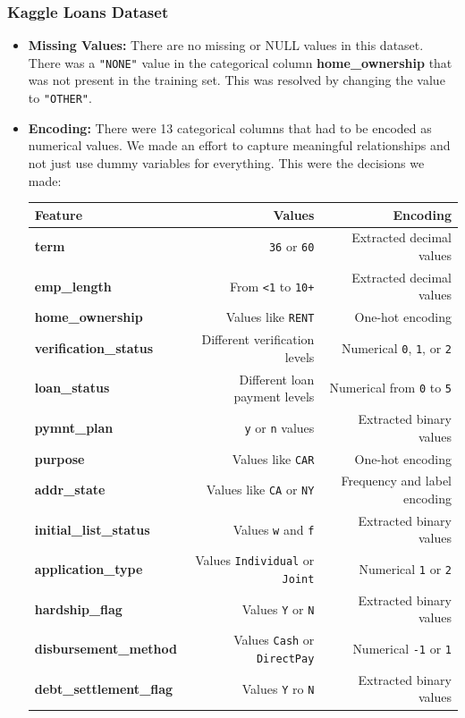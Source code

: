\documentclass[12pt,a4paper]{article}
\begin{document}
\subsubsection{Kaggle Loans Dataset}
\begin{itemize}
\item \textbf{Missing Values:} There are no missing or NULL values in this dataset. There was a \texttt{"NONE"} value in the categorical column \textbf{home\_ownership} that was not present in the training set. This was resolved by changing the value to \texttt{"OTHER"}.
\item \textbf{Encoding:} There were 13 categorical columns that had to be encoded as numerical values. We made an effort to capture meaningful relationships and not just use dummy variables for everything. This were the decisions we made:

\begin{table}[h]
\centering
\label{tab:Data_summary}
\begin{tabular}{lrr}
    \toprule
        Feature & Values & Encoding \\
        \midrule
        \textbf{term} & \texttt{36} or \texttt{60} & Extracted decimal values \\
        \textbf{emp\_length} & From \texttt{<1} to \texttt{10+} & Extracted decimal values \\
        \textbf{home\_ownership} & Values like \texttt{RENT} & One-hot encoding \\
        \textbf{verification\_status} & Different verification levels & Numerical \texttt{0}, \texttt{1}, or \texttt{2} \\
        \textbf{loan\_status} & Different loan payment levels & Numerical from \texttt{0} to \texttt{5} \\
        \textbf{pymnt\_plan} & \texttt{y} or \texttt{n} values &  Extracted binary values \\
        \textbf{purpose} & Values like \texttt{CAR} & One-hot encoding \\
        \textbf{addr\_state} & Values like \texttt{CA} or \texttt{NY} & Frequency and label encoding \\
        \textbf{initial\_list\_status} & Values \texttt{w} and \texttt{f} & Extracted binary values \\
        \textbf{application\_type} & Values \texttt{Individual} or \texttt{Joint} & Numerical \texttt{1} or \texttt{2} \\
        \textbf{hardship\_flag} &  Values \texttt{Y} or \texttt{N} & Extracted binary values \\
        \textbf{disbursement\_method} & Values \texttt{Cash} or \texttt{DirectPay} & Numerical \texttt{-1} or \texttt{1} \\
        \textbf{debt\_settlement\_flag} & Values \texttt{Y} ro \texttt{N} & Extracted binary values \\
        \bottomrule
    \end{tabular}
\end{table}


\end{itemize}
\end{document}
